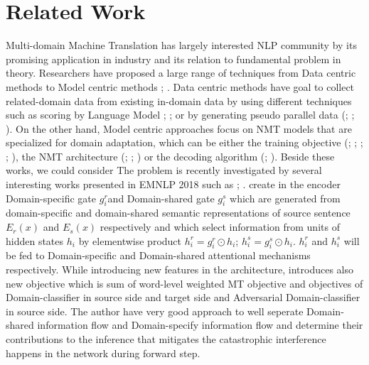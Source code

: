 \documentclass[11pt,a4paper]{article}
\begin{document}
\section{Related Work}
Multi-domain Machine Translation has largely interested NLP community by its promising application in industry and its relation to fundamental problem in theory. Researchers have proposed a large range of techniques from Data centric methods to Model centric methods \cite{C18-1111}; \cite{P17-2061}. Data centric methods have goal to collect related-domain data from existing in-domain data by using different techniques such as scoring by Language Model \cite{P10-2041}; \cite{D11-1033}; \cite{P13-2119} or by generating pseudo parallel data (\cite{P03-1010}; \cite{C16-1295}; \cite{D14-1023}). On the other hand, Model centric approaches focus on NMT models that are specialized for domain adaptation, which can be either the training objective (\cite{Luong2015SNMT}; \cite{P16-1009}; \cite{D17-1155}; \cite{W17-3205}; \cite{D17-1156}), the NMT architecture (\cite{R17-1049}; \cite{gulcehre2016monolingual}; \cite{W17-4712}) or the decoding algorithm (\cite{gulcehre2016monolingual}; \cite{I17-2004}). Beside these works, we could consider  
The problem is recently investigated by several interesting works presented in EMNLP 2018 such as \cite{D18-1039}; \cite{D18-1041}. \cite{D18-1041} create in the encoder Domain-specific gate $g^r_i$and Domain-shared gate $g^s_i$ which are generated from domain-specific and domain-shared semantic representations of source sentence $E_r(x)$ and $E_s(x)$ respectively and which select information from units of hidden states $h_i$ by elementwise product $h^r_i = g^r_i \odot h_i$; $h^s_i = g^s_i \odot h_i$. $h^r_i$ and $h^s_i$ will be fed to Domain-specific and Domain-shared attentional mechanisms respectively. While introducing new features in the architecture, \cite{D18-1041} introduces also new objective which is sum of word-level weighted MT objective and objectives of Domain-classifier in source side and target side and Adversarial Domain-classifier in source side. The author have very good approach to well seperate Domain-shared information flow and Domain-specify information flow and determine their contributions to the inference that mitigates the catastrophic interference happens in the network during forward step. 
\end{document}
